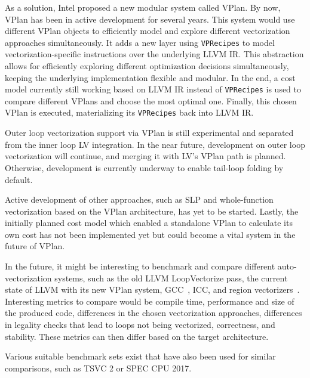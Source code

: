 \documentclass[sigplan,11pt,nonacm]{acmart}
\begin{document}
As a solution, Intel proposed a new modular system called VPlan.
By now, VPlan has been in active development for several years. 
This system would use different VPlan objects to efficiently 
model and explore different vectorization approaches simultaneously.
It adds a new layer using \texttt{VPRecipes} to model 
vectorization-specific instructions over the underlying LLVM IR. 
This abstraction allows for efficiently exploring different optimization decisions simultaneously, 
keeping the underlying implementation flexible and modular. In the end, a cost model currently still 
working based on LLVM IR instead of \texttt{VPRecipes} is used to compare different VPlans 
and choose the most optimal one. Finally, this chosen VPlan is executed, materializing its \texttt{VPRecipes} 
back into LLVM IR.

Outer loop vectorization support via VPlan is still experimental and separated from the inner loop
LV integration. In the near future, development on outer loop vectorization will continue, and merging 
it with LV's VPlan path is planned. Otherwise, development is currently underway to enable 
tail-loop folding by default.

Active development of other approaches, such as SLP and whole-function vectorization based on the VPlan 
architecture, has yet to be started. Lastly, the initially planned cost model which enabled a standalone 
VPlan to calculate its own cost has not been implemented yet but could become a vital system in the future 
of VPlan.

In the future, it might be interesting to benchmark and compare different auto-vectorization systems, 
such as the old LLVM LoopVectorize pass, the current state of LLVM with its new VPlan system, 
GCC~\cite{autovecoptgcc}, ICC, and region vectorizers~\cite{Moll_2021,10.1145/3303117.3306172,rv}. Interesting metrics to 
compare would be compile time, performance and size of the produced code, differences in the chosen 
vectorization approaches, differences in legality checks that lead to loops not being vectorized, 
correctness, and stability. These metrics can then differ based on the target architecture.

Various suitable benchmark sets exist that have also been used for similar 
comparisons, such as TSVC 2 or SPEC CPU 2017.



\end{document}
